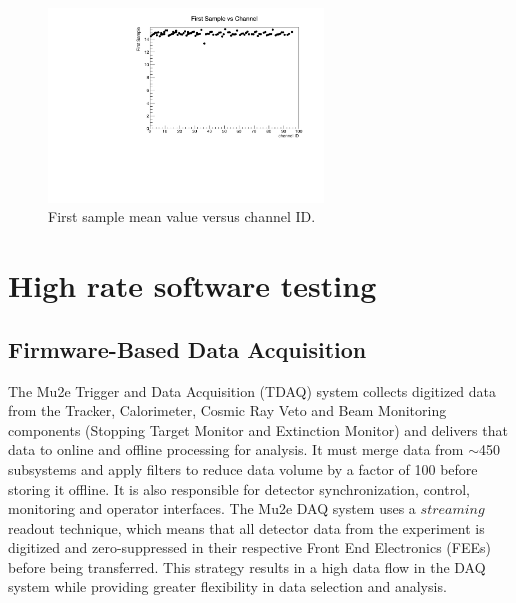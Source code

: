 \begin{figure}[!h]
  \centering
  \includegraphics[width=0.65\textwidth]{figures/pdf/fs_vs_ch1.pdf}
  \caption{First sample mean value versus channel ID.}
  \label{fig:fsvsch}
\end{figure}




\iffalse


\section{High rate software testing}
\subsection{Firmware-Based Data Acquisition}
The Mu2e Trigger and Data Acquisition (TDAQ) system collects digitized data from the Tracker, 
Calorimeter, Cosmic Ray Veto and Beam Monitoring components (Stopping Target Monitor and Extinction Monitor) 
and delivers that data to online and offline processing for analysis. It must merge data from $\sim$450 subsystems 
and apply filters to reduce data volume by a factor of 100 before storing it offline. It is also responsible for 
detector synchronization, control, monitoring and operator interfaces. The Mu2e DAQ system uses a $streaming$ readout technique, 
which means that all detector data from the experiment is digitized and zero-suppressed in their respective Front End Electronics 
(FEEs) before being transferred. This strategy results in a high data flow in the DAQ system while providing greater flexibility in data selection and analysis.
